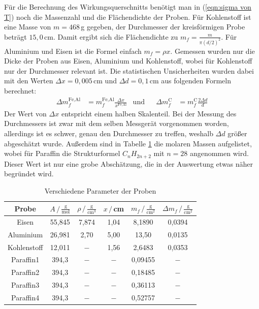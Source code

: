 \documentclass[german, parskip=full]{scrartcl}
\newcommand{\tecxt}{}
\begin{document}
Für die Berechnung des Wirkungsquerschnitts benötigt man in (\ref{eqn:sigma von T}) noch die Massenzahl und die Flächendichte der Proben. Für Kohlenstoff ist eine Masse von $m=468\,$g gegeben, der Durchmesser der kreisförmigen Probe beträgt $15,0\,$cm. Damit ergibt sich die Flächendichte zu $m_f=\frac{m}{\pi (d/2)^2}$. Für Aluminium und Eisen ist die Formel einfach $m_f=\rho x$. Gemessen wurden nur die Dicke der Proben aus Eisen, Aluminium und Kohlenstoff, wobei für Kohlenstoff nur der Durchmesser relevant ist. Die statistischen Unsicherheiten wurden dabei mit den Werten $\Delta x=0,005\,$cm und $\Delta d=0,1\,$cm aus folgenden Formeln berechnet:
\begin{align*}
\Delta m_f^\tecxt\text{Fe,Al}&=m_f^\tecxt\text{Fe,Al}\frac{\Delta x}{x^\tecxt\text{Fe,Al}}&\tecxt\text{und}&&\Delta m_f^\tecxt\text{C}&=m_f^\tecxt\text{C}\frac{2\Delta d}{d}
\end{align*}
Der Wert von $\Delta x$ entspricht einem halben Skalenteil. Bei der Messung des Durchmessers ist zwar mit dem selben Messgerät vorgenommen worden, allerdings ist es schwer, genau den Durchmesser zu treffen, weshalb $\Delta d$ größer abgeschätzt wurde. Außerdem sind in Tabelle \ref{table:Proben Parameter} die molaren Massen aufgelistet, wobei für Paraffin die Strukturformel $C_nH_{2n+2}$ mit $n=28$ angenommen wird. Dieser Wert ist nur eine grobe Abschätzung, die in der Auswertung etwas näher begründet wird. 
\begin{table}[h!]
\centering
\begin{tabular}{c|c|c|c|c|c}
Probe&$A\,/\,\frac{\tecxt\text{g}}{\tecxt\text{mol}}$&$\rho\,/\,\frac{\tecxt\text{g}}{\tecxt\text{cm}^3}$&$x\,/\,$cm&$m_f\,/\,\frac{\tecxt\text{g}}{\tecxt\text{cm}^2}$&$\Delta m_f\,/\,\frac{\tecxt\text{g}}{\tecxt\text{cm}^2}$\\ \hline
Eisen&55,845&7,874&1,04&8,1890&0,0394\\ \hline
Aluminium&26,981&2,70&5,00&13,50&0,0135\\ \hline
Kohlenstoff&12,011&$-$&1,56&2,6483&0,0353\\ \hline
Paraffin1&394,3&$-$&$-$&0,09455&$-$\\ \hline
Paraffin2&394,3&$-$&$-$&0,18485&$-$\\ \hline
Paraffin3&394,3&$-$&$-$&0,36113&$-$\\ \hline
Paraffin4&394,3&$-$&$-$&0,52757&$-$\\ \hline
\end{tabular}
\caption{Verschiedene Parameter der Proben}
\label{table:Proben Parameter}
\end{table}
\end{document}
